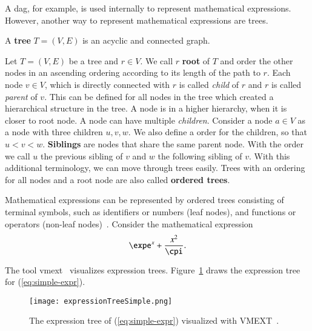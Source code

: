 A \gls{dag}, for example, is used internally to represent mathematical expressions. However, another way to represent mathematical expressions are trees.

\begin{definition}[Tree]
A \textbf{tree} $T = (V,E)$ is an acyclic and connected graph.
\end{definition}

Let $T = (V,E)$ be a tree and $r \in V$. We call $r$ \textbf{root} of $T$ and order the other nodes in an ascending ordering according to its length of the path to $r$. Each node $v \in V$, which is directly connected with $r$ is called \textit{child} of $r$ and $r$ is called \textit{parent} of $v$. This can be defined for all nodes in the tree which created a hierarchical structure in the tree. A node is in a higher hierarchy, when it is closer to root node. A node can have multiple \textit{children}. Consider a node $a \in V$ as a node with three children $u,v,w$. We also define a order for the children, so that $u < v < w$. \textbf{Siblings} are nodes that share the same parent node. With the order we call $u$ the previous sibling of $v$ and $w$ the following sibling of $v$. With this additional terminology, we can move through trees easily. Trees with an ordering for all nodes and a root node are also called \textbf{ordered trees}.

Mathematical expressions can be represented by ordered trees consisting of terminal symbols, such as identifiers or numbers (leaf nodes), and functions or operators (non-leaf nodes)~\cite{VMEXT}. Consider the mathematical expression
\begin{equation}\label{eq:simple-expr}
\expe^{x} + \frac{x^2}{\cpi}.
\end{equation}

The tool \gls{vmext}~\cite{VMEXT} visualizes expression trees. Figure~\ref{fig:simple-expr-tree} draws the expression tree for (\ref{eq:simple-expr}).

\begin{figure}[ht]
    \centering
    \texttt{[image: expressionTreeSimple.png]}
    \caption{The expression tree of (\ref{eq:simple-expr}) visualized with VMEXT~\cite{VMEXT}.}
    \label{fig:simple-expr-tree}
\end{figure}